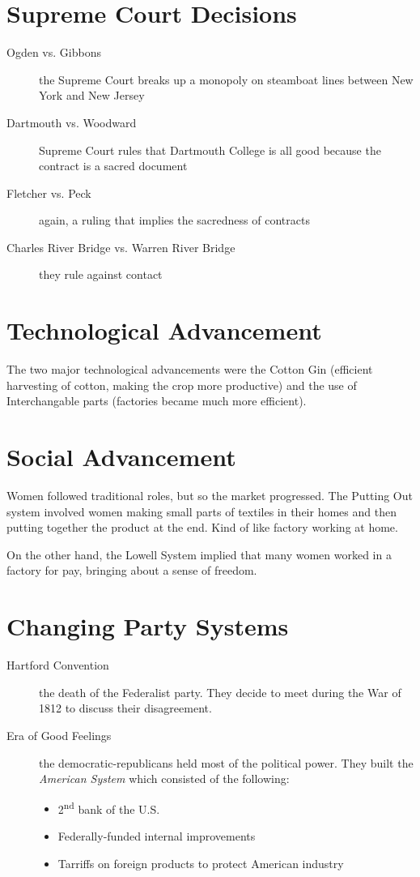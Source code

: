 \section{Supreme Court Decisions}
\begin{description}
  \item[Ogden vs. Gibbons] the Supreme Court breaks up a monopoly on steamboat
    lines between New York and New Jersey
  \item[Dartmouth vs. Woodward] Supreme Court rules that Dartmouth College is
    all good because the contract is a sacred document
  \item[Fletcher vs. Peck] again, a ruling that implies the sacredness of
    contracts
  \item[Charles River Bridge vs. Warren River Bridge] they rule against contact
\end{description}

\section{Technological Advancement}
The two major technological advancements were the Cotton Gin (efficient
harvesting of cotton, making the crop more productive) and the use of
Interchangable parts (factories became much more efficient).

\section{Social Advancement}
Women followed traditional roles, but so the market progressed.  The Putting Out
system involved women making small parts of textiles in their homes and then
putting together the product at the end.  Kind of like factory working at home.

On the other hand, the Lowell System implied that many women worked in a factory
for pay, bringing about a sense of freedom.

\section{Changing Party Systems}
\begin{description}
  \item[Hartford Convention] the death of the Federalist party.  They decide to
    meet during the War of 1812 to discuss their disagreement.
  \item[Era of Good Feelings] the democratic-republicans held most of the
    political power.  They built the \textit{American System} which consisted of
    the following:
    \begin{itemize}
      \item 2\textsuperscript{nd} bank of the U.S.
      \item Federally-funded internal improvements
      \item Tarriffs on foreign products to protect American industry
    \end{itemize}
\end{description}

